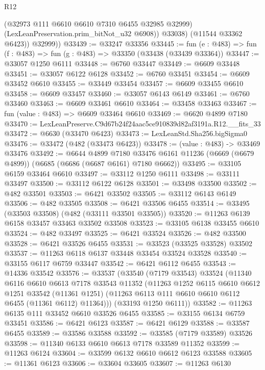 \begin{lexlean}{R12}
\begin{coremodule}
              (@32973 @111 @6610 @6610 @7310 @6455 @32985 @32999)
              (LexLeanPreservation.prim_bitNot_u32 @6908))
            @33038)
          (@11544 @33362 @6423))
        @32999))
@33439 := @33247 @33356
@33445 := fun (e : @483) => fun (f : @483) => fun (g : @483) => @33350 (@33438 (@33439 @33364))
@33447 := @33057 @1250 @6111
@33448 := @6760 @33447
@33449 := @6609 @33448
@33451 := @33057 @6122 @6128
@33452 := @6760 @33451
@33454 := @6609 @33452 @6610
@33455 := @33449 @33454
@33457 := @6609 @33455 @6610
@33458 := @6609 @33457
@33460 := @33057 @6143 @6149
@33461 := @6760 @33460
@33463 := @6609 @33461 @6610
@33464 := @33458 @33463
@33467 := fun (value : @483) => @6609 @33464 @6610
@33469 := @6620 @4899 @7180
@33470 := LexLeanPreserve.C9d67b24f24aac5ce910839d82af3191a.R12.__fits_33
@33472 := @6630 (@33470 @6423)
@33473 := LexLeanStd.Sha256.bigSigma0
@33476 := @33472 (@482 (@33473 @6423))
@33478 := (value : @483) -> @33469 @33476
@33492 := @6644
    @4899
    @7180
    @33476
    @6161
    @11236
    (@6669 (@6679 @4899))
    (@6685 (@6686 (@6687 @6161) @7180 @6662))
@33495 := @33105 @6159 @33464 @6610
@33497 := @33112 @1250 @6111
@33498 := @33111 @33497
@33500 := @33112 @6122 @6128
@33501 := @33498 @33500
@33502 := @482 @33501
@33503 := @6421 @33502
@33505 := @33112 @6143 @6149
@33506 := @482 @33505
@33508 := @6421 @33506 @6455
@33514 := @33495 (@33503 @33508) (@482 (@33111 @33501 @33505))
@33520 := @11263 @6139 @6158 @33457 @33463 @33502 @33508
@33523 := @33105 @6138 @33455 @6610
@33524 := @482 @33497
@33525 := @6421 @33524
@33526 := @482 @33500
@33528 := @6421 @33526 @6455
@33531 := @33523 (@33525 @33528) @33502
@33537 := @11263 @6118 @6137 @33448 @33454 @33524 @33528
@33540 := @33155 @6117 @6759 @33447
@33542 := @6421 @6112 @6455
@33543 := @14336 @33542
@33576 := @33537
    (@33540
      (@7179 @33543)
      @33524
      (@11340
        @6116
        @6610
        @6613
        @7178
        @33543
        @11352
        (@11263
          @1252
          @6115
          @6610
          @6612
          @1251
          @33542
          (@11361 @1251)
          (@11263 @6113 @111 @6610 @6610 @6112 @6455 (@11361 @6112) @11364)))
      (@33193 @1250 @6111))
@33582 := @11263 @6135 @111 @33452 @6610 @33526 @6455
@33585 := @33155 @6134 @6759 @33451
@33586 := @6421 @6123
@33587 := @6421 @6129
@33588 := @33587 @6455
@33589 := @33586 @33588
@33592 := @33585 (@7179 @33589) @33526
@33598 := @11340 @6133 @6610 @6613 @7178 @33589 @11352
@33599 := @11263 @6124
@33604 := @33599 @6132 @6610 @6612 @6123 @33588
@33605 := @11361 @6123
@33606 := @33604 @33605
@33607 := @11263 @6130

\end{coremodule}
\end{lexlean}
